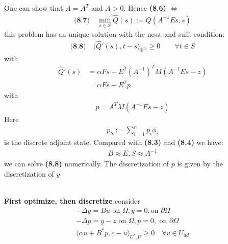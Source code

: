 One can show that $A = A^T$ and $A > 0$. Hence \textbf{(8.6)} $\Leftrightarrow$
\begin{align*}
\textbf{(8.7)} \quad
	\min_{s \in S} \hat{Q}(s):= Q(A^{-1}Es, s )
\end{align*}
this problem has an unique solution with the ness. and suff. condition:
\begin{align*}
\textbf{(8.8)} \quad
	\langle \hat{Q}'(s), t - s \rangle_{\mathbb{R}^m} \ge 0 \qquad \forall t \in S
\end{align*}
with
\begin{align*}
	\hat{Q}'(s) &= \alpha F s + E^T(A^{-1})^T M(A^{-1} Es - z)\\
	&= \alpha F s + E^T p
\end{align*}
with
\begin{align*}
	p = A^T M (A^{-1} Es - z)
\end{align*}
Here
\begin{align*}
	p_h:= \sum_{i = 1}^n p_i \phi_i 
\end{align*}
is the discrete adjoint state. Compared with \textbf{(8.3)} and \textbf{(8.4)} we have:
\begin{align*}
	B \approx E, S \approx A^{-1}
\end{align*}
we can solve \textbf{(8.8)} numerically. The discretization of $p$ is given by the discretization of $y$

\quad\\
\textbf{First optimize, then discretize}
consider
\begin{align*}
	-\Delta y = Bu \text{ on } \Omega, y = 0, \text{on } \partial \Omega\\
	-\Delta p = y - z \text{ on } \Omega, p = 0, \text{ on } \partial \Omega\\
	\langle \alpha u + B^*p , c - u \rangle_{U^*, U} \geq 0 \quad \forall v 
	\in U_{ad}
\end{align*}

